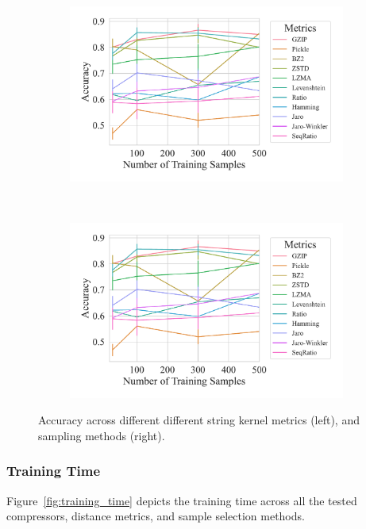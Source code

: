 \documentclass[sigconf]{acmart}
\begin{document}
\begin{figure}
	\begin{subfigure}
		\centering
		\includegraphics[width=.46\textwidth]{figs/kdd_nsl/metric_vs_accuracy.pdf}
	\end{subfigure}
	~
	\begin{subfigure}
		\centering
		\includegraphics[width=.46\textwidth]{figs/kdd_nsl/metric_vs_accuracy.pdf}
	\end{subfigure}
	\caption{Accuracy across different different string kernel metrics (left), and sampling methods (right).}
	\label{fig:accuracy_kdd}
\end{figure}

\subsubsection{Training Time}

Figure~\ref{fig:training_time} depicts the training time across all the tested compressors, distance metrics, and sample selection methods.
\end{document}
